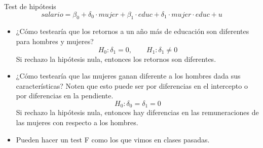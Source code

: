 \documentclass{beamer}
\begin{document}
\begin{frame}{Test de hipótesis}
\[
salario = \beta_0 + \delta_0 \cdot mujer + \beta_1 \cdot educ + \delta_1 \cdot mujer \cdot educ + u
\]

\begin{itemize}
    \item ¿Cómo testearía que los retornos a un año más de educación son diferentes para hombres y mujeres?
    \[
    H_0: \delta_1 = 0, \qquad H_1: \delta_1 \neq 0
    \]
    Si rechazo la hipótesis nula, entonces los retornos son diferentes.
    \item ¿Cómo testearía que las mujeres ganan diferente a los hombres dada sus características? Noten que esto puede ser por diferencias en el intercepto o por diferencias en la pendiente.
    \[
    H_0: \delta_0 = \delta_1 = 0
    \]
    Si rechazo la hipótesis nula, entonces hay diferencias en las remuneraciones de las mujeres con respecto a los hombres.
    \item Pueden hacer un test F como los que vimos en clases pasadas.
\end{itemize}
\end{frame}
\end{document}
